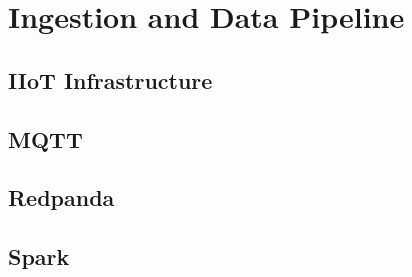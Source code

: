 \section{Ingestion and Data Pipeline}
\label{sec:ingestion_data_pipeline}

\subsection{IIoT Infrastructure}
\label{subsec:iiot_infrastructure}

\subsection{MQTT}
\label{subsec:mqtt}

\subsection{Redpanda}
\label{subsec:redpanda}

\subsection{Spark}
\label{subsec:spark}

